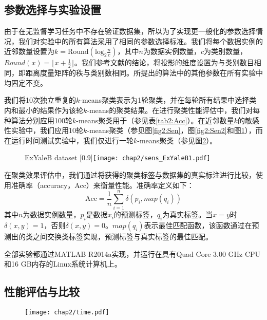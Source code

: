 \subsection{参数选择与实验设置}
由于在无监督学习任务中不存在验证数据集，所以为了实现更一般化的参数选择情况，我们对实验中的所有算法采用了相同的参数选择标准。我们将每个数据实例的近邻数量设置为$k = \mathrm{Round}(\mathrm{log}_2\frac{n}{c})$，其中$n$为数据实例数量，$c$为类别数量，$Round(x)=\lfloor x+\frac{1}{2}\rfloor$。我们参考文献\parencite{ng2002spectral}的结论，将投影的维度设置为与类别数目相同，即距离度量矩阵的秩与类别数相同。所提出的算法中的其他参数在所有实验中均固定不变。

我们将10次独立重复的$k$-means聚类表示为1轮聚类，并在每轮所有结果中选择类内和最小的结果作为该轮$k$-means的聚类结果。在进行聚类性能评估中，我们对每种算法分别应用100轮$k$-means聚类用于（参见表\ref{tab2:Acc}）。在近邻数量$k$的敏感性实验中，我们应用10轮$k$-means聚类（参见图\ref{fig2:Sen}，图\ref{fig2:Sen2}和图\ref{fig2:Sen3}），而在运行时间测试实验中，我们仅进行一轮$k$-means聚类（参见图\ref{fig2:Time}）。


\begin{figure}[t]
	\centering
					{ExYaleB dataset}
					[0.9\textwidth]{\texttt{[image: chap2/sens\_ExYaleB1.pdf]}}
	\label{fig2:Sen3}
\end{figure} 
在聚类效果评估中，我们通过将获得的聚类标签与数据集的真实标注进行比较，使用准确率（accuracy，Acc）来衡量性能。准确率定义如下：
\begin{equation}
	\mathrm{Acc} = \frac{1}{n}\sum^{n}_{i=1}\delta(p_i, map(q_i))
\end{equation}
其中$n$为数据实例数量，$p_i$是数据$x_i$的预测标签，$q_i$为真实标签。当$x=y$时$\delta(x, y) = 1$，否则$\delta(x,y) = 0$。$map(q_i)$表示最佳匹配函数，该函数通过在预测出的类之间交换类标签实现，预测标签与真实标签的最佳匹配。

全部实验都通过MATLAB R2014a实现，并运行在具有Quad Core 3.00 GHz CPU和16 GB内存的Linux系统计算机上。

\subsection{性能评估与比较}
\begin{figure}[t]
	\centering
	\texttt{[image: chap2/time.pdf]}
	\label{fig2:Time}
\end{figure}

